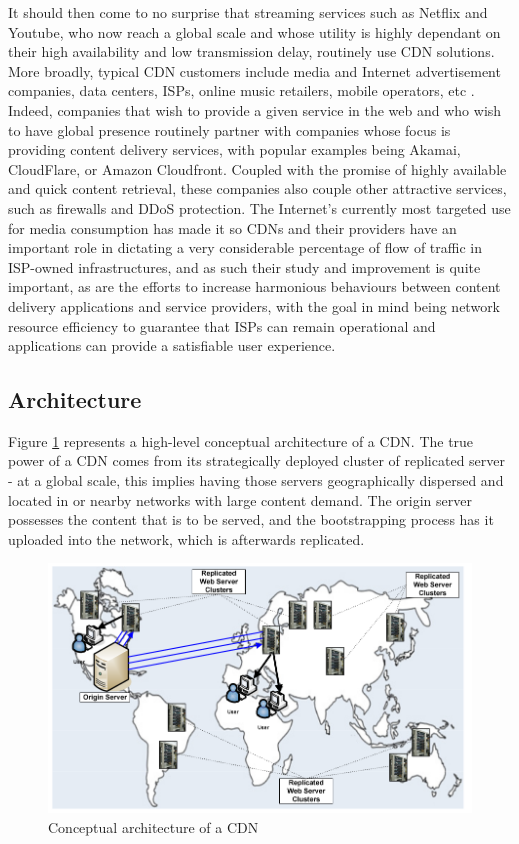     It should then come to no surprise that streaming services such as Netflix and Youtube, who now reach a global scale and whose utility is highly dependant on their high availability and low transmission delay, routinely use CDN solutions.
    More broadly, typical CDN customers include media and Internet advertisement companies, data centers, ISPs, online music retailers, mobile operators, etc \cite{cdn-survey}.
    Indeed, companies that wish to provide a given service in the web and who wish to have global presence routinely partner with companies whose focus is providing content delivery services, with popular examples being Akamai, CloudFlare, or Amazon Cloudfront.
    Coupled with the promise of highly available and quick content retrieval, these companies also couple other attractive services, such as firewalls and DDoS protection.
    The Internet's currently most targeted use for media consumption has made it so CDNs and their providers have an important role in dictating a very considerable percentage of flow of traffic in ISP-owned infrastructures, and as such their study and improvement is quite important, as are the efforts to increase harmonious behaviours between content delivery applications and service providers, with the goal in mind being network resource efficiency to guarantee that ISPs can remain operational and applications can provide a satisfiable user experience.

\subsection{Architecture}

    Figure \ref{fig:cdn-conceptual-architecture} represents a high-level conceptual architecture of a CDN.
    The true power of a CDN comes from its strategically deployed cluster of replicated server - at a global scale, this implies having those servers geographically dispersed and located in or nearby networks with large content demand.
    The origin server possesses the content that is to be served, and the bootstrapping process has it uploaded into the network, which is afterwards replicated.

\begin{figure}[!h]
\centering
\includegraphics[scale=0.5]{img/cdn-architecture.png}
\caption{Conceptual architecture of a CDN \cite{cdn-survey}}
\label{fig:cdn-conceptual-architecture}
\end{figure}

